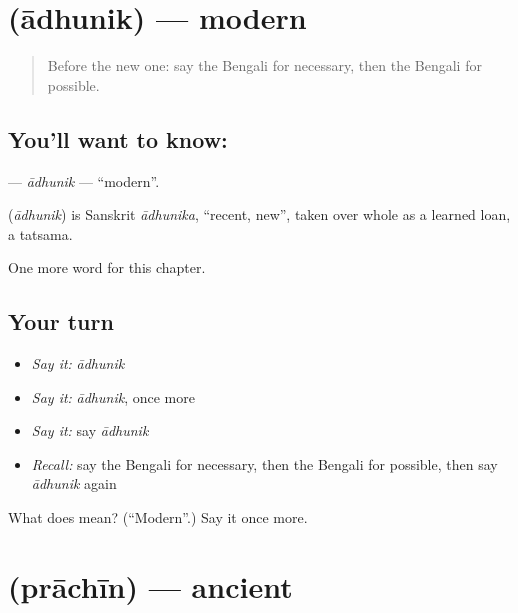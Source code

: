 \section[\texorpdfstring{\bn{আধুনিক} (ādhunik)}{আধুনিক (ādhunik)}]{ (ādhunik) — modern}

\label{lesson:BN-C191-adhunik}



\begin{quote}
Before the new one: say the Bengali for necessary, then the Bengali for possible.
\end{quote}

\subsection*{You'll want to know: }
\textbf{} — \emph{ādhunik} — \textquotedblleft{}modern\textquotedblright{}.

\begin{cousinweb}
\textbf{} (\emph{ādhunik}) is Sanskrit \emph{ādhunika}, \textquotedblleft{}recent, new\textquotedblright{}, taken over whole as a learned loan, a tatsama.
\end{cousinweb}

\begin{grammarlens}[title={What you've built}]
One more word for this chapter.
\end{grammarlens}

\subsection*{Your turn}
\begin{itemize}
\raggedright
  \item \emph{Say it:} \emph{ādhunik}
  \item \emph{Say it:} \emph{ādhunik}, once more
  \item \emph{Say it:} say \emph{ādhunik}
  \item \emph{Recall:} say the Bengali for necessary, then the Bengali for possible, then say \emph{ādhunik} again
\end{itemize}

\begin{tcolorbox}[breakable,colback=teal!4,colframe=teal!35!black,title={Before you move on}]
What does  mean? (\textquotedblleft{}Modern\textquotedblright{}.) Say it once more.
\end{tcolorbox}
\section[\texorpdfstring{\bn{প্রাচীন} (prāchīn)}{প্রাচীন (prāchīn)}]{ (prāchīn) — ancient}


